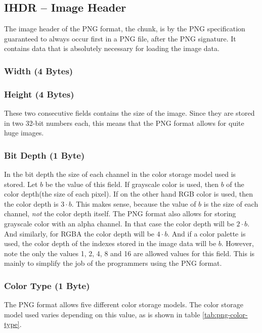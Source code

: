\subsection{IHDR -- Image Header}

The image header of the PNG format, the  chunk, is by the
PNG specification guaranteed to always occur first in a PNG file,
after the PNG signature. It contains data that is absolutely necessary
for loading the image data.

\subsubsection*{Width (4 Bytes)}
\subsubsection*{Height (4 Bytes)}

These two consecutive fields contains the size of the image. Since
they are stored in two 32-bit numbers each, this means that the PNG
format allows for quite huge images.

\subsubsection*{Bit Depth (1 Byte)}

In the bit depth the size of each channel in the color storage model
used is stored. Let $b$ be the value of this field. If grayscale color
is used, then $b$ of the color depth(the size of each pixel). If on
the other hand RGB color is used, then the color depth is $3 \cdot
b$. This makes sense, because the value of $b$ is the size of each
channel, \textit{not} the color depth itself. The PNG format also
allows for storing grayscale color with an alpha channel. In that case
the color depth will be $2 \cdot b$. And similarly, for RGBA the color
depth will be $4 \cdot b$. And if a color palette is used, the color
depth of the indexes stored in the image data will be $b$. However,
note the only the values 1, 2, 4, 8 and 16 are allowed values for this
field. This is mainly to simplify the job of the programmers using the
PNG format.

\subsubsection*{Color Type (1 Byte)}

The PNG format allows five different color storage models. The color
storage model used varies depending on this value, as is shown in
table \ref{tab:png-color-type}.

